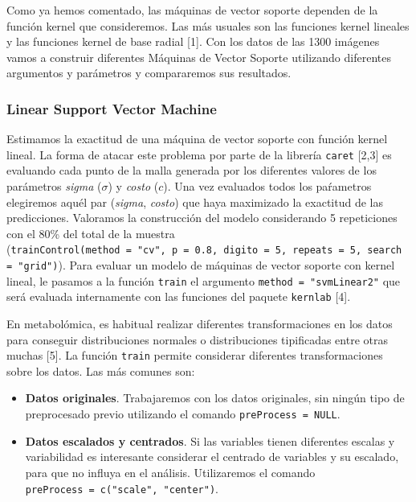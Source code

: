 \documentclass[12pt,spanish,a4paper]{article}
\numberwithin{equation}{section}
\begin{document}
Como ya hemos comentado, las máquinas de vector soporte dependen de la
función kernel que consideremos. Las más usuales son las funciones
kernel lineales y las funciones kernel de base radial {[}1{]}. Con los
datos de las 1300 imágenes vamos a construir diferentes Máquinas de
Vector Soporte utilizando diferentes argumentos y parámetros y
compararemos sus resultados.

\hypertarget{linear-support-vector-machine}{%
\subsubsection{Linear Support Vector
Machine}\label{linear-support-vector-machine}}

Estimamos la exactitud de una máquina de vector soporte con función
kernel lineal. La forma de atacar este problema por parte de la librería
\texttt{caret} {[}2,3{]} es evaluando cada punto de la malla generada
por los diferentes valores de los parámetros \emph{sigma} (\(\sigma\)) y
\emph{costo} (\(c\)). Una vez evaluados todos los paŕametros elegiremos
aquél par (\emph{sigma}, \emph{costo}) que haya maximizado la exactitud
de las predicciones. Valoramos la construcción del modelo considerando 5
repeticiones con el 80\% del total de la muestra
(\texttt{trainControl(method\ =\ "cv",\ p\ =\ 0.8,\ digito\ =\ 5,\ repeats\ =\ 5,\ search\ =\ "grid")}).
Para evaluar un modelo de máquinas de vector soporte con kernel lineal,
le pasamos a la función \texttt{train} el argumento
\texttt{method\ =\ "svmLinear2"} que será evaluada internamente con las
funciones del paquete \texttt{kernlab} {[}4{]}.

En metabolómica, es habitual realizar diferentes transformaciones en los
datos para conseguir distribuciones normales o distribuciones
tipificadas entre otras muchas {[}5{]}. La función \texttt{train}
permite considerar diferentes transformaciones sobre los datos. Las más
comunes son:

\begin{itemize}
\item
  \textbf{Datos originales}. Trabajaremos con los datos originales, sin
  ningún tipo de preprocesado previo utilizando el comando
  \texttt{preProcess\ =\ NULL}.
\item
  \textbf{Datos escalados y centrados}. Si las variables tienen
  diferentes escalas y variabilidad es interesante considerar el
  centrado de variables y su escalado, para que no influya en el
  análisis. Utilizaremos el comando
  \texttt{preProcess\ =\ c("scale",\ "center")}.
\end{itemize}
\end{document}
